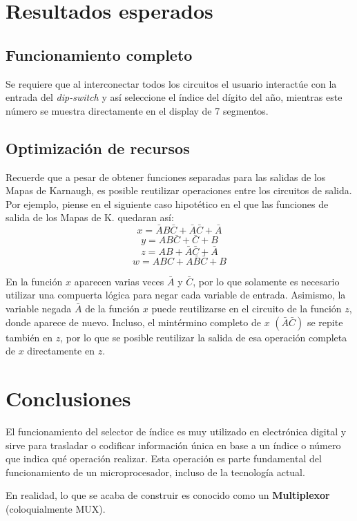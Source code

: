 \pagebreak

\section{Resultados esperados}
\subsection{Funcionamiento completo}
Se requiere que al interconectar todos los circuitos el usuario interactúe con la entrada del \emph{dip-switch} y así seleccione el índice del dígito del año, mientras
este número se muestra directamente en el display de 7 segmentos.

\subsection{Optimización de recursos}
Recuerde que a pesar de obtener funciones separadas para las salidas de los Mapas de Karnaugh, es posible reutilizar operaciones entre los circuitos de salida.
Por ejemplo, piense en el siguiente caso hipotético en el que las funciones de salida de los Mapas de K. quedaran así:
$$ x = \bar A B \bar C + \bar A \bar C + \bar A$$
$$ y = AB\bar C + \bar C + B $$
$$ z = AB + \bar A \bar C + \bar A $$
$$ w = ABC + A\bar B \bar C + B $$

En la función $x$ aparecen varias veces $\bar A$ y $\bar C$, por lo que solamente es necesario utilizar una compuerta lógica para negar cada variable de entrada. Asimismo,
la variable negada $\bar A$ de la función $x$ puede reutilizarse en el circuito de la función $z$, donde aparece de nuevo. Incluso, el mintérmino completo de $x$ $(\bar A \bar C)$
se repite también en $z$, por lo que se posible reutilizar la salida de esa operación completa de $x$ directamente en $z$. 


\section{Conclusiones}
El funcionamiento del selector de índice es muy utilizado en electrónica digital y sirve para trasladar o codificar información única
en base a un índice o número que indica qué operación realizar. Esta operación es parte fundamental del funcionamiento de un microprocesador,
incluso de la tecnología actual.

\vspace{14pt}

En realidad, lo que se acaba de construir es conocido como un \textbf{Multiplexor} (coloquialmente MUX).